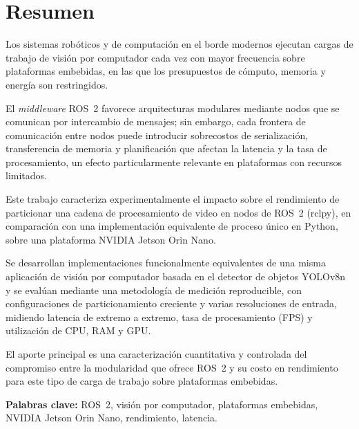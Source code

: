 \chapter*{Resumen}

Los sistemas robóticos y de computación en el borde modernos ejecutan cargas de trabajo de visión por
computador cada vez con mayor frecuencia sobre plataformas embebidas, en
las que los presupuestos de cómputo, memoria y energía son restringidos.

El \emph{middleware} ROS~2 favorece arquitecturas modulares mediante nodos
que se comunican por intercambio de mensajes; sin embargo, cada frontera de
comunicación entre nodos puede introducir sobrecostos de serialización,
transferencia de memoria y planificación que afectan la latencia y la tasa
de procesamiento, un efecto particularmente relevante en plataformas con
recursos limitados. 

Este trabajo caracteriza experimentalmente el impacto
sobre el rendimiento de particionar una cadena de procesamiento de video en
nodos de ROS~2 (rclpy), en comparación con una implementación equivalente
de proceso único en Python, sobre una plataforma NVIDIA Jetson Orin Nano.

Se desarrollan implementaciones funcionalmente equivalentes de una misma
aplicación de visión por computador basada en el detector de objetos YOLOv8n y se evalúan mediante
una metodología de
medición reproducible, con configuraciones de particionamiento creciente 
y varias resoluciones de entrada,
midiendo latencia de extremo a extremo, tasa de procesamiento (FPS) y
utilización de CPU, RAM y GPU.


 El aporte principal es una caracterización cuantitativa y
controlada del compromiso entre la modularidad que ofrece ROS~2 y su costo
en rendimiento para este tipo de carga de trabajo sobre plataformas
embebidas.

\bigskip
\noindent\textbf{Palabras clave:} ROS~2, visión por computador, plataformas
embebidas, NVIDIA Jetson Orin Nano, rendimiento, latencia.
